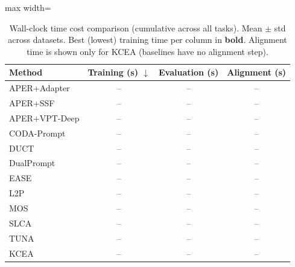 \begin{table}[!t]
\centering
\caption{Wall-clock time cost comparison (cumulative across all tasks). Mean $\pm$ std across datasets. Best (lowest) training time per column in \textbf{bold}. Alignment time is shown only for KCEA (baselines have no alignment step).}
\label{tab:cost-time}
\renewcommand{\arraystretch}{0.95}
\begin{adjustbox}{max width=\textwidth}
\footnotesize
\begin{tabular}{l c c c}
\toprule
Method & \textbf{Training (s)} $\downarrow$ & \textbf{Evaluation (s)} & \textbf{Alignment (s)} \\
\midrule
APER+Adapter & -- & -- & -- \\
APER+SSF & -- & -- & -- \\
APER+VPT-Deep & -- & -- & -- \\
CODA-Prompt & -- & -- & -- \\
DUCT & -- & -- & -- \\
DualPrompt & -- & -- & -- \\
EASE & -- & -- & -- \\
L2P & -- & -- & -- \\
MOS & -- & -- & -- \\
SLCA & -- & -- & -- \\
TUNA & -- & -- & -- \\
\midrule
KCEA & -- & -- & -- \\
\bottomrule
\end{tabular}
\end{adjustbox}
\end{table}